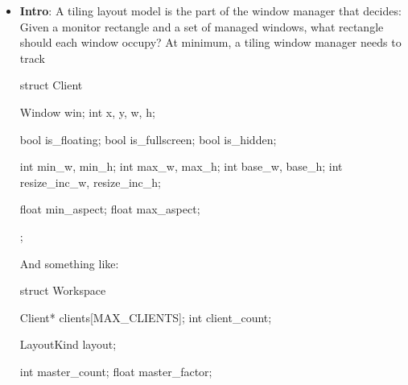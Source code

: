 \documentclass{report}
\begin{document}
    \pagebreak 
    \begin{itemize}
        
    \end{itemize}

    \pagebreak 
    \begin{itemize}
        \item \textbf{Intro}: A tiling layout model is the part of the window manager that decides: Given a monitor rectangle and a set of managed windows, what rectangle should each window occupy?
            \bigbreak \noindent 
            At minimum, a tiling window manager needs to track
            \bigbreak \noindent 
            \begin{cppcode}
                struct Client {
                    Window win;
                    int x, y, w, h;

                    bool is_floating;
                    bool is_fullscreen;
                    bool is_hidden;

                    int min_w, min_h;
                    int max_w, max_h;
                    int base_w, base_h;
                    int resize_inc_w, resize_inc_h;

                    float min_aspect;
                    float max_aspect;
                };
            \end{cppcode}
            \bigbreak \noindent 
            And something like:
            \bigbreak \noindent 
            \begin{cppcode}
                struct Workspace {
                    Client* clients[MAX_CLIENTS];
                    int client_count;

                    LayoutKind layout;

                    int master_count;
                    float master_factor;

}
\end{cppcode}
\end{itemize}
\end{document}

